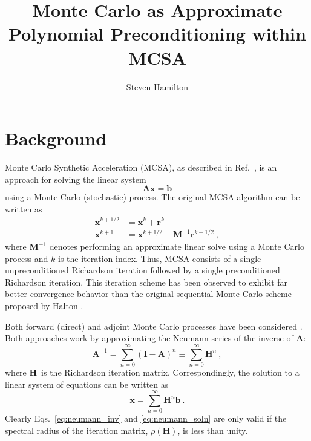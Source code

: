 \documentclass[10pt]{article}
\title{Monte Carlo as Approximate Polynomial Preconditioning within MCSA}
\author{Steven Hamilton}
\newcommand{\bx}{\ensuremath{\mathbf{x}}}
\newcommand{\bb}{\ensuremath{\mathbf{b}}}
\newcommand{\br}{\ensuremath{\mathbf{r}}}
\newcommand{\bA}{\ensuremath{\mathbf{A}}}
\newcommand{\bH}{\ensuremath{\mathbf{H}}}
\newcommand{\bM}{\ensuremath{\mathbf{M}}}
\newcommand{\bI}{\ensuremath{\mathbf{I}}}
\begin{document}
\maketitle

\section{Background}
\label{sec:background}

Monte Carlo Synthetic Acceleration (MCSA), as described in Ref.~\cite{evans_13},
is an approach for solving the linear system
\begin{equation}
\bA \bx = \bb \label{eq:lin_problem}
\end{equation}
using a Monte Carlo (stochastic) process.
The original MCSA algorithm can be written as
\begin{equation}
\begin{aligned}
\bx^{k+1/2} &= \bx^{k} + \br^{k} \\
\bx^{k+1} &= \bx^{k+1/2} + \bM^{-1}\br^{k+1/2} \:,
\end{aligned}
\end{equation}
where $\bM^{-1}$ denotes performing an approximate linear solve using a
Monte Carlo process and $k$ is the iteration index.
Thus, MCSA consists of a single unpreconditioned
Richardson iteration followed by a single preconditioned Richardson iteration.
This iteration scheme has been observed to exhibit far better convergence
behavior than the original sequential Monte Carlo scheme proposed by Halton
\cite{halton_94}.

Both forward (direct) and adjoint Monte Carlo processes have been considered
\cite{slattery_13,evans_13}.
Both approaches work by approximating the Neumann
series of the inverse of \bA:
\begin{equation}
\bA^{-1} = \sum_{n=0}^{\infty} ( \bI - \bA )^n
\equiv \sum_{n=0}^{\infty} \bH^n \:, \label{eq:neumann_inv}
\end{equation}
where \bH\ is the Richardson iteration matrix.
Correspondingly, the solution to a linear system of equations can
be written as
\begin{equation}
\bx = \sum_{n=0}^{\infty} \bH^n \bb \:. \label{eq:neumann_soln}
\end{equation}
Clearly
Eqs.~\eqref{eq:neumann_inv} and \eqref{eq:neumann_soln} are only
valid if the spectral radius of
the iteration matrix, $\rho(\bH)$, is less than unity.
\end{document}
